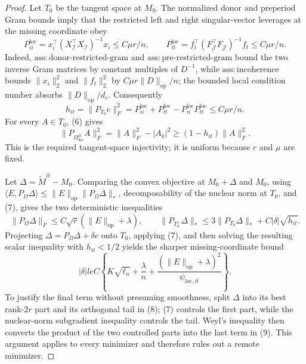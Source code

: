 \documentclass{article}
\begin{document}
\begin{proof}
Let \(T_0\) be the tangent space at \(M_0\). The normalized donor and preperiod Gram bounds imply that the restricted left and right singular-vector leverages at the missing coordinate obey
\[
 P_{ii}^{\mathrm{loc}}=x_i^{\top}(X_{\mathcal I}^{\top}X_{\mathcal I})^{-1}x_i
 \le C\mu r/n,
 \qquad
 P_{tt}^{\mathrm{loc}}=f_t^{\top}(F_{\mathcal J}^{\top}F_{\mathcal J})^{-1}f_t
 \le C\mu r/n.
\tag{5}
\]
Indeed, \(\mathrm{ass:donor\mbox{-}restricted\mbox{-}gram}\) and \(\mathrm{ass:pre\mbox{-}restricted\mbox{-}gram}\) bound the two inverse Gram matrices by constant multiples of \(D^{-1}\), while \(\mathrm{ass:incoherence}\) bounds \(\|x_i\|_2^2\) and \(\|f_t\|_2^2\) by \(C\mu r\|D\|_{\mathrm{op}}/n\); the bounded local condition number absorbs \(\|D\|_{\mathrm{op}}/d_r\). Consequently
\[
 h_{it}=\|P_{T_0}e\|_F^2
 =P_{ii}^{\mathrm{loc}}+P_{tt}^{\mathrm{loc}}
  -P_{ii}^{\mathrm{loc}}P_{tt}^{\mathrm{loc}}
 \le C\mu r/n.
\tag{6}
\]
For every \(A\in T_0\), (6) gives
\[
 \|P_{\Omega_{\mathrm{loc}}^{it}}A\|_F^2
 =\|A\|_F^2-|A_k|^2
 \ge(1-h_{it})\|A\|_F^2.
\tag{7}
\]
This is the required tangent-space injectivity; it is uniform because \(r\) and \(\mu\) are fixed.

Let \(\Delta=\widetilde M^{it}-M_0\). Comparing the convex objective at \(M_0+\Delta\) and \(M_0\), using
\(\langle E,P_\Omega\Delta\rangle\le\|E\|_{\mathrm{op}}\|P_\Omega\Delta\|_*\), decomposability of the nuclear norm at \(T_0\), and (7), gives the two deterministic inequalities
\[
 \|P_\Omega\Delta\|_F
 \le C\sqrt r(\|E\|_{\mathrm{op}}+\lambda),
 \qquad
 \|P_{T_0^\perp}\Delta\|_*
 \le3\|P_{T_0}\Delta\|_*+C|\delta|\sqrt{h_{it}}.
\tag{8}
\]
Projecting \(\Delta=P_\Omega\Delta+\delta e\) onto \(T_0\), applying (7), and then solving the resulting scalar inequality with \(h_{it}<1/2\) yields the sharper missing-coordinate bound
\[
 |\delta|le C\left\{K\sqrt{\ell_n}+\frac{\lambda}{n}
 +\frac{(\|E\|_{\mathrm{op}}+\lambda)^2}{\psi_{\mathrm{loc},it}}\right\}.
\tag{9}
\]
To justify the final term without presuming smoothness, split \(\Delta\) into its best rank-\(2r\) part and its orthogonal tail in (8); (7) controls the first part, while the nuclear-norm subgradient inequality controls the tail. Weyl's inequality then converts the product of the two controlled parts into the last term in (9). This argument applies to every minimizer and therefore rules out a remote minimizer.


\end{proof}
\end{document}

